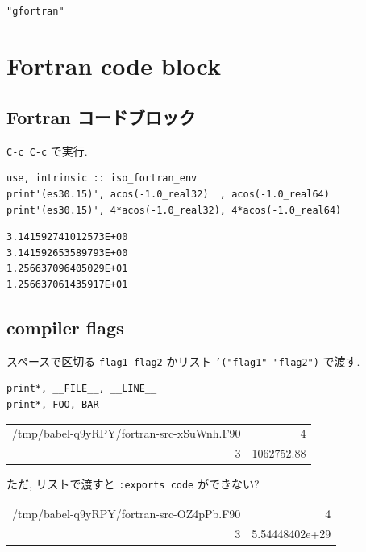 \documentclass[lualatex,a4paper,12pt,report,ja=standard]{bxjsarticle}
\begin{document}
\begin{verbatim}

"gfortran"
\end{verbatim}

\section{Fortran code block}
\label{sec:org052aee4}
\subsection{Fortran コードブロック}
\label{sec:org1587ae9}
\texttt{C-c C-c} で実行.
\begin{verbatim}
use, intrinsic :: iso_fortran_env
print'(es30.15)', acos(-1.0_real32)  , acos(-1.0_real64)
print'(es30.15)', 4*acos(-1.0_real32), 4*acos(-1.0_real64)
\end{verbatim}

\begin{verbatim}
3.141592741012573E+00
3.141592653589793E+00
1.256637096405029E+01
1.256637061435917E+01
\end{verbatim}

\subsection{compiler flags}
\label{sec:org47ec441}
スペースで区切る \texttt{flag1 flag2} かリスト \texttt{'("flag1" "flag2")} で渡す.
\begin{verbatim}
print*, __FILE__, __LINE__
print*, FOO, BAR
\end{verbatim}

\begin{center}
\begin{tabular}{rr}
/tmp/babel-q9yRPY/fortran-src-xSuWnh.F90 & 4\\
3 & 1062752.88\\
\end{tabular}
\end{center}

ただ, リストで渡すと \texttt{:exports code} ができない?
\begin{center}
\begin{tabular}{rr}
/tmp/babel-q9yRPY/fortran-src-OZ4pPb.F90 & 4\\
3 & 5.54448402e+29\\
\end{tabular}
\end{center}
\end{document}
